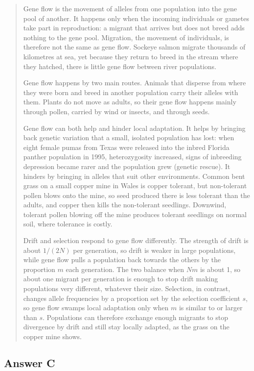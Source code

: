 \documentclass[
  a4paper]{book}
\begin{document}
\begin{quote}
Gene flow is the movement of alleles from one population into the gene pool of another. It happens only when the incoming individuals or gametes take part in reproduction: a migrant that arrives but does not breed adds nothing to the gene pool. Migration, the movement of individuals, is therefore not the same as gene flow. Sockeye salmon migrate thousands of kilometres at sea, yet because they return to breed in the stream where they hatched, there is little gene flow between river populations.

Gene flow happens by two main routes. Animals that disperse from where they were born and breed in another population carry their alleles with them. Plants do not move as adults, so their gene flow happens mainly through pollen, carried by wind or insects, and through seeds.

Gene flow can both help and hinder local adaptation. It helps by bringing back genetic variation that a small, isolated population has lost: when eight female pumas from Texas were released into the inbred Florida panther population in 1995, heterozygosity increased, signs of inbreeding depression became rarer and the population grew (genetic rescue). It hinders by bringing in alleles that suit other environments. Common bent grass on a small copper mine in Wales is copper tolerant, but non-tolerant pollen blows onto the mine, so seed produced there is less tolerant than the adults, and copper then kills the non-tolerant seedlings. Downwind, tolerant pollen blowing off the mine produces tolerant seedlings on normal soil, where tolerance is costly.

Drift and selection respond to gene flow differently. The strength of drift is about \(1/(2N)\) per generation, so drift is weaker in large populations, while gene flow pulls a population back towards the others by the proportion \(m\) each generation. The two balance when \(Nm\) is about 1, so about one migrant per generation is enough to stop drift making populations very different, whatever their size. Selection, in contrast, changes allele frequencies by a proportion set by the selection coefficient \(s\), so gene flow swamps local adaptation only when \(m\) is similar to or larger than \(s\). Populations can therefore exchange enough migrants to stop divergence by drift and still stay locally adapted, as the grass on the copper mine shows.
\end{quote}

\subsection{Answer C}\label{answer-c}
\end{document}
